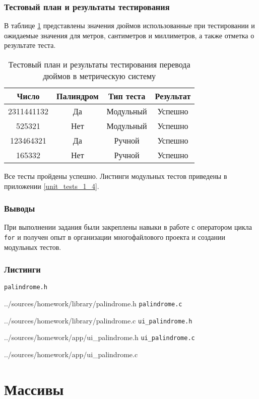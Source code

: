 \documentclass[12pt,a4paper]{report}
\begin{document}
\subsection{Тестовый план и результаты тестирования}
\hspace{\parindent}В таблице \ref{inch_to_cm_test_plan} представлены значения дюймов использованные при тестировании и ожидаемые значения для метров, сантиметров и миллиметров, а также отметка о результате теста.
\FloatBarrier
\begin{table}[h]
\caption{Тестовый план и результаты тестирования перевода дюймов в метрическую систему}
\label{inch_to_cm_test_plan}
\begin{tabular}{| c | c | c | c |}
\hline 
Число & Палиндром & Тип теста & Результат\\ 
\hline 
2311441132 & Да & Модульный & Успешно \\ 
\hline 
525321 & Нет & Модульный & Успешно \\ 
\hline 
123464321 & Да & Ручной & Успешно \\ 
\hline 
165332 & Нет & Ручной & Успешно \\ 
\hline 
\end{tabular} 
\end{table}
\FloatBarrier
Все тесты пройдены успешно. Листинги модульных тестов приведены в приложении \ref{unit_tests_1_4}.
\subsection{Выводы}
\hspace{\parindent}При выполнении задания были закреплены навыки в работе с оператором цикла \verb+for+ и получен опыт в организации многофайлового проекта и создании модульных тестов.

\newpage
\subsection{Листинги}
\verb+palindrome.h+

{../sources/homework/library/palindrome.h}
\verb+palindrome.c+

{../sources/homework/library/palindrome.c}
\verb+ui_palindrome.h+

{../sources/homework/app/ui_palindrome.h}
\verb+ui_palindrome.c+

{../sources/homework/app/ui_palindrome.c}


\newpage



\chapter{Массивы}
\end{document}
